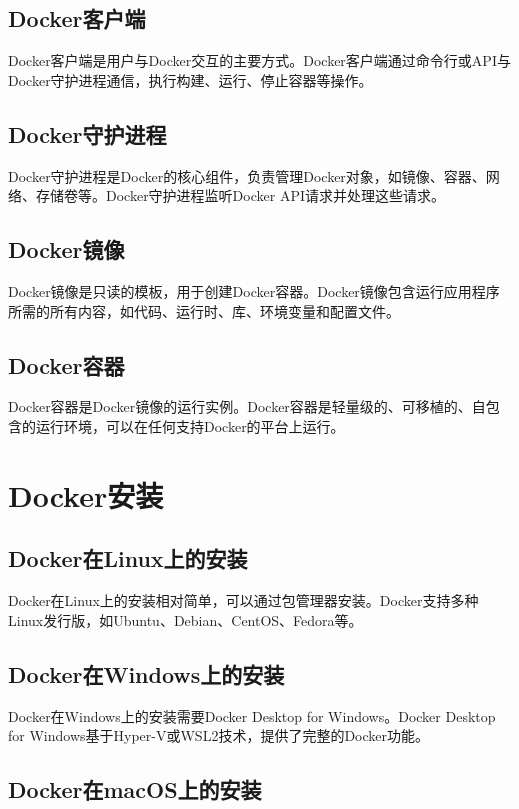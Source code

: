\documentclass[12pt,UTF8]{ctexbook}
\begin{document}
\section{Docker客户端}

Docker客户端是用户与Docker交互的主要方式。Docker客户端通过命令行或API与Docker守护进程通信，执行构建、运行、停止容器等操作。

\section{Docker守护进程}

Docker守护进程是Docker的核心组件，负责管理Docker对象，如镜像、容器、网络、存储卷等。Docker守护进程监听Docker API请求并处理这些请求。

\section{Docker镜像}

Docker镜像是只读的模板，用于创建Docker容器。Docker镜像包含运行应用程序所需的所有内容，如代码、运行时、库、环境变量和配置文件。

\section{Docker容器}

Docker容器是Docker镜像的运行实例。Docker容器是轻量级的、可移植的、自包含的运行环境，可以在任何支持Docker的平台上运行。

\chapter{Docker安装}

\section{Docker在Linux上的安装}

Docker在Linux上的安装相对简单，可以通过包管理器安装。Docker支持多种Linux发行版，如Ubuntu、Debian、CentOS、Fedora等。

\section{Docker在Windows上的安装}

Docker在Windows上的安装需要Docker Desktop for Windows。Docker Desktop for Windows基于Hyper-V或WSL2技术，提供了完整的Docker功能。

\section{Docker在macOS上的安装}
\end{document}
